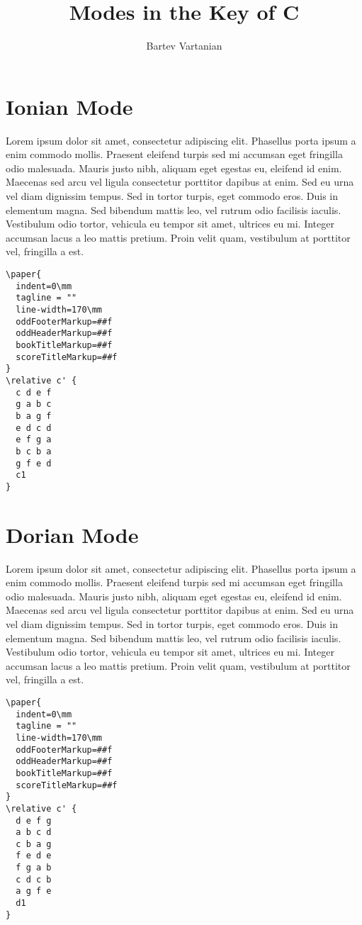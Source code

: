 \documentclass[11pt]{article}
\author{Bartev Vartanian}
\date{}
\title{Modes in the Key of C}
\begin{document}
\maketitle

\section*{Ionian Mode}
\label{sec:org73500d9}

Lorem ipsum dolor sit amet, consectetur adipiscing elit. Phasellus
porta ipsum a enim commodo mollis. Praesent eleifend turpis sed mi
accumsan eget fringilla odio malesuada. Mauris justo nibh, aliquam
eget egestas eu, eleifend id enim. Maecenas sed arcu vel ligula
consectetur porttitor dapibus at enim. Sed eu urna vel diam dignissim
tempus. Sed in tortor turpis, eget commodo eros. Duis in elementum
magna. Sed bibendum mattis leo, vel rutrum odio facilisis iaculis.
Vestibulum odio tortor, vehicula eu tempor sit amet, ultrices eu mi.
Integer accumsan lacus a leo mattis pretium. Proin velit quam,
vestibulum at porttitor vel, fringilla a est.

\begin{verbatim}
\paper{
  indent=0\mm
  tagline = ""
  line-width=170\mm
  oddFooterMarkup=##f
  oddHeaderMarkup=##f
  bookTitleMarkup=##f
  scoreTitleMarkup=##f
}
\relative c' {
  c d e f
  g a b c
  b a g f
  e d c d
  e f g a
  b c b a
  g f e d
  c1
}
\end{verbatim}

\section*{Dorian Mode}
\label{sec:org547a2ac}

Lorem ipsum dolor sit amet, consectetur adipiscing elit. Phasellus
porta ipsum a enim commodo mollis. Praesent eleifend turpis sed mi
accumsan eget fringilla odio malesuada. Mauris justo nibh, aliquam
eget egestas eu, eleifend id enim. Maecenas sed arcu vel ligula
consectetur porttitor dapibus at enim. Sed eu urna vel diam dignissim
tempus. Sed in tortor turpis, eget commodo eros. Duis in elementum
magna. Sed bibendum mattis leo, vel rutrum odio facilisis iaculis.
Vestibulum odio tortor, vehicula eu tempor sit amet, ultrices eu mi.
Integer accumsan lacus a leo mattis pretium. Proin velit quam,
vestibulum at porttitor vel, fringilla a est.

\begin{verbatim}
\paper{
  indent=0\mm
  tagline = ""
  line-width=170\mm
  oddFooterMarkup=##f
  oddHeaderMarkup=##f
  bookTitleMarkup=##f
  scoreTitleMarkup=##f
}
\relative c' {
  d e f g
  a b c d
  c b a g
  f e d e
  f g a b
  c d c b
  a g f e
  d1
}
\end{verbatim}
\end{document}
